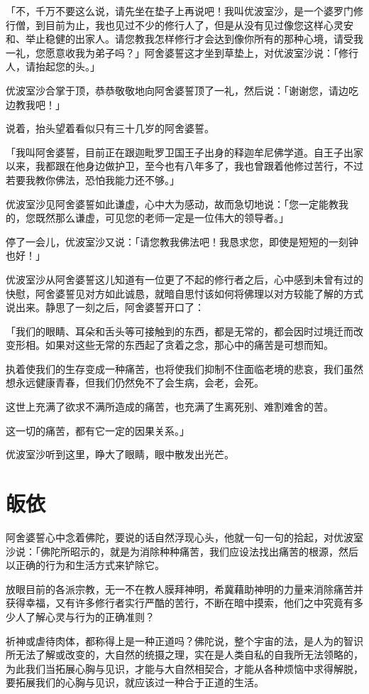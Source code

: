 \documentclass[twoside,openany]{book}
\begin{document}
「不，千万不要这么说，请先坐在垫子上再说吧！我叫优波室沙，是一个婆罗门修行僧，到目前为止，我也见过不少的修行人了，但是从没有见过像您这样心灵安和、举止稳健的出家人。请您教我怎样修行才会达到像你所有的那种心境，请受我一礼，您愿意收我为弟子吗？」阿舍婆誓这才坐到草垫上，对优波室沙说：「修行人，请抬起您的头。」

优波室沙合掌于顶，恭恭敬敬地向阿舍婆誓顶了一礼，然后说：「谢谢您，请边吃边教我吧！」

说着，抬头望着看似只有三十几岁的阿舍婆誓。

「我叫阿舍婆誓，目前正在跟迦毗罗卫国王子出身的释迦牟尼佛学道。自王子出家以来，我都跟在他身边做护卫，至今也有八年多了，我也曾跟着他修过苦行，不过若要我教你佛法，恐怕我能力还不够。」

优波室沙见阿舍婆誓如此谦虚，心中大为感动，故而急切地说：「您一定能教我的，您既然那么谦虚，可见您的老师一定是一位伟大的领导者。」

停了一会儿，优波室沙又说：「请您教我佛法吧！我恳求您，即使是短短的一刻钟也好！」

优波室沙从阿舍婆誓这儿知道有一位更了不起的修行者之后，心中感到未曾有过的快慰，阿舍婆誓见对方如此诚恳，就暗自思忖该如何将佛理以对方较能了解的方式说出来。静思了一刻之后，阿舍婆誓开口了：

「我们的眼睛、耳朵和舌头等可接触到的东西，都是无常的，都会因时过境迁而改变形相。如果对这些无常的东西起了贪着之念，那心中的痛苦是可想而知。

执着使我们的生存变成一种痛苦，也将使我们抑制不住面临老境的悲哀，我们虽然想永远健康青春，但我们仍然免不了会生病，会老，会死。

这世上充满了欲求不满所造成的痛苦，也充满了生离死别、难割难舍的苦。

这一切的痛苦，都有它一定的因果关系。」

优波室沙听到这里，睁大了眼睛，眼中散发出光芒。

\section{皈依}\label{sec3.15}

阿舍婆誓心中念着佛陀，要说的话自然浮现心头，他就一句一句的拾起，对优波室沙说：「佛陀所昭示的，就是为消除种种痛苦，我们应设法找出痛苦的根源，然后以正确的行为和生活方式来铲除它。

放眼目前的各派宗教，无一不在教人膜拜神明，希冀藉助神明的力量来消除痛苦并获得幸福，又有许多修行者实行严酷的苦行，不断在暗中摸索，他们之中究竟有多少人了解心灵与行为的正确准则？

祈神或虐待肉体，都称得上是一种正道吗？佛陀说，整个宇宙的法，是人为的智识所无法了解或改变的，大自然的统摄之理，实在是人类自私的自我所无法领略的，为此我们当拓展心胸与见识，才能与大自然相契合，才能从各种烦恼中求得解脱，要拓展我们的心胸与见识，就应该过一种合于正道的生活。
\end{document}
